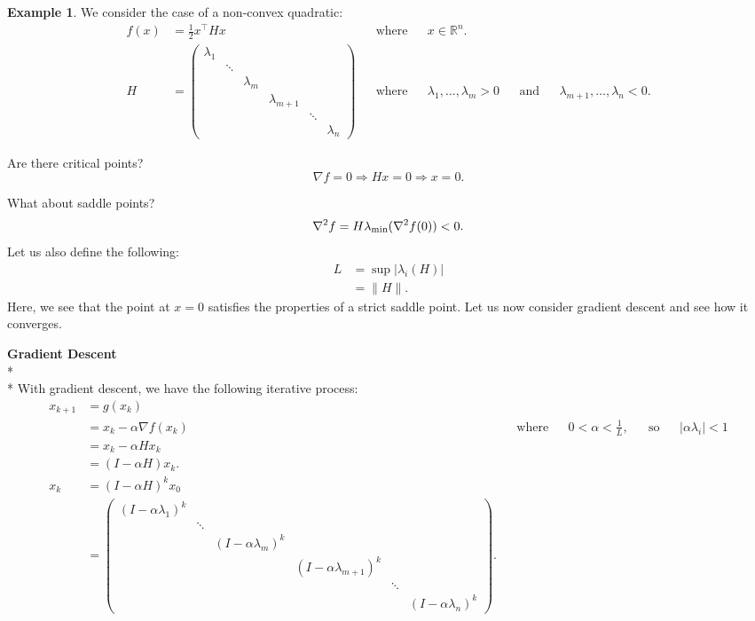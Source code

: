 \documentclass[twoside]{article}
\theoremstyle{definition}
\theoremstyle{definition}
\newtheorem{exmp}{Example}
\theoremstyle{remark}
\begin{document}
\begin{exmp}
We consider the case of a non-convex quadratic:
\[
\begin{aligned}
f(x) &= \frac{1}{2} x^\top Hx && \text{where} && x \in \mathbb{R}^{n}. \\
H &= \begin{pmatrix}
\lambda_1 & & & & & \\
& \ddots & & & & \\
& & \lambda_m & & & \\
& & & \lambda_{m+1} & & \\
& & & & \ddots & \\
& & & & & \lambda_n
\end{pmatrix} && \text{where} && \lambda_1, \ldots, \lambda_m > 0 && \text{and} && \lambda_{m+1}, \ldots, \lambda_n < 0.
\end{aligned}
\]

Are there critical points?
$$ \nabla f = 0 \Rightarrow Hx = 0 \Rightarrow x = 0. $$

What about saddle points?
\[
\nabla^2 f = H \\
\lambda_\text{min} (\nabla^2 f(0)) < 0.
\]
Let us also define the following:
\[
\begin{aligned}
L &= \sup | \lambda_i (H) | \\
&= \| H \|.
\end{aligned}
\]
Here, we see that the point at $x = 0$ satisfies the properties of a strict saddle point. Let us now consider gradient descent and see how it converges.

\textbf{Gradient Descent} \\* \\*
With gradient descent, we have the following iterative process:
\[
\begin{aligned}
x_{k+1} &= g(x_k) \\
&= x_k - \alpha \nabla f(x_k) && \text{where} && 0 < \alpha < \frac{1}{L}, && \text{so} && | \alpha \lambda_i | < 1 \\
&= x_k - \alpha H x_k \\
&= (I - \alpha H) x_k. \\
x_k &= (I - \alpha H)^k x_0 \\
&= \begin{pmatrix}
(I - \alpha \lambda_1)^k & & & & & \\
& \ddots & & & & \\
& & (I - \alpha \lambda_m)^k & & & \\
& & & (I - \alpha \lambda_{m+1})^k & & \\
& & & & \ddots & \\
& & & & & (I - \alpha \lambda_n)^k
\end{pmatrix}.
\end{aligned}
\]


\end{exmp}
\end{document}
